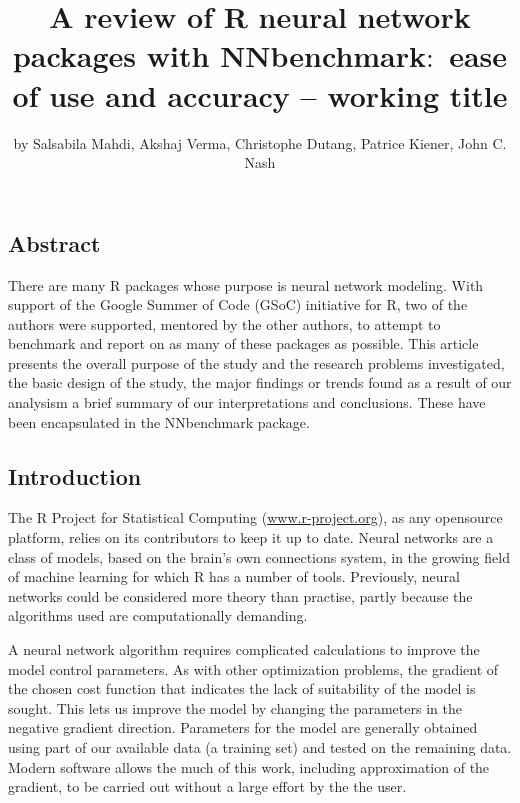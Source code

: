 \title{A review of R neural network packages with NNbenchmark\(:\) ease
of use and accuracy -- working title}
\author{by Salsabila Mahdi, Akshaj Verma, Christophe Dutang, Patrice
Kiener, John C. Nash}

\maketitle


\hypertarget{abstract}{%
\subsection{Abstract}\label{abstract}}

There are many R packages whose purpose is neural network modeling. With
support of the Google Summer of Code (GSoC) initiative for R, two of the
authors were supported, mentored by the other authors, to attempt to
benchmark and report on as many of these packages as possible. This
article presents the overall purpose of the study and the research
problems investigated, the basic design of the study, the major findings
or trends found as a result of our analysism a brief summary of our
interpretations and conclusions. These have been encapsulated in the
NNbenchmark package.

\hypertarget{introduction}{%
\subsection{Introduction}\label{introduction}}

The R Project for Statistical Computing (\url{www.r-project.org}), as
any opensource platform, relies on its contributors to keep it up to
date. Neural networks are a class of models, based on the brain's own
connections system, in the growing field of machine learning for which R
has a number of tools. Previously, neural networks could be considered
more theory than practise, partly because the algorithms used are
computationally demanding.

A neural network algorithm requires complicated calculations to improve
the model control parameters. As with other optimization problems, the
gradient of the chosen cost function that indicates the lack of
suitability of the model is sought. This lets us improve the model by
changing the parameters in the negative gradient direction. Parameters
for the model are generally obtained using part of our available data (a
training set) and tested on the remaining data. Modern software allows
the much of this work, including approximation of the gradient, to be
carried out without a large effort by the the user.

